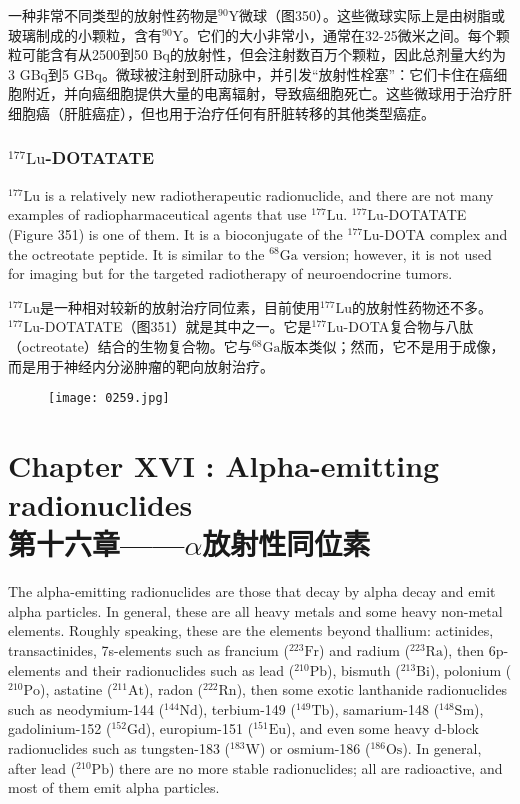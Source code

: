 \documentclass[dvipsnames, svgnames,a4paper,11pt]{article}
\begin{document}
一种非常不同类型的放射性药物是\(\mathrm{^{90}Y}\)微球（图350）。这些微球实际上是由树脂或玻璃制成的小颗粒，含有\(\mathrm{^{90}Y}\)。它们的大小非常小，通常在32-25微米之间。每个颗粒可能含有从2500到50 Bq的放射性，但会注射数百万个颗粒，因此总剂量大约为3 GBq到5 GBq。微球被注射到肝动脉中，并引发“放射性栓塞”：它们卡住在癌细胞附近，并向癌细胞提供大量的电离辐射，导致癌细胞死亡。这些微球用于治疗肝细胞癌（肝脏癌症），但也用于治疗任何有肝脏转移的其他类型癌症。

\subsubsection{\(\mathrm{^{177}Lu}\)-DOTATATE}  
\(\mathrm{^{177}Lu}\) is a relatively new radiotherapeutic radionuclide, and there are not many examples of radiopharmaceutical agents that use \(\mathrm{^{177}Lu}\). \(\mathrm{^{177}Lu}\)-DOTATATE (Figure 351) is one of them. It is a bioconjugate of the \(\mathrm{^{177}Lu}\)-DOTA complex and the octreotate peptide. It is similar to the \(\mathrm{^{68}Ga}\) version; however, it is not used for imaging but for the targeted radiotherapy of neuroendocrine tumors.

\(\mathrm{^{177}Lu}\)是一种相对较新的放射治疗同位素，目前使用\(\mathrm{^{177}Lu}\)的放射性药物还不多。\(\mathrm{^{177}Lu}\)-DOTATATE（图351）就是其中之一。它是\(\mathrm{^{177}Lu}\)-DOTA复合物与八肽（octreotate）结合的生物复合物。它与\(\mathrm{^{68}Ga}\)版本类似；然而，它不是用于成像，而是用于神经内分泌肿瘤的靶向放射治疗。

\begin{figure}[h]
    \centering
    \texttt{[image: 0259.jpg]}
     \label{fig351}
\end{figure}

\newpage




\section{Chapter XVI : Alpha-emitting radionuclides\\第十六章——$\alpha$放射性同位素}  
The alpha-emitting radionuclides are those that decay by alpha decay and emit alpha particles. In general, these are all heavy metals and some heavy non-metal elements. Roughly speaking, these are the elements beyond thallium: actinides, transactinides, 7s-elements such as francium (\(\mathrm{^{223}Fr}\)) and radium (\(\mathrm{^{223}Ra}\)), then 6p-elements and their radionuclides such as lead (\(\mathrm{^{210}Pb}\)), bismuth (\(\mathrm{^{213}Bi}\)), polonium (\(\mathrm{^{210}Po}\)), astatine (\(\mathrm{^{211}At}\)), radon (\(\mathrm{^{222}Rn}\)), then some exotic lanthanide radionuclides such as neodymium-144 (\(\mathrm{^{144}Nd}\)), terbium-149 (\(\mathrm{^{149}Tb}\)), samarium-148 (\(\mathrm{^{148}Sm}\)), gadolinium-152 (\(\mathrm{^{152}Gd}\)), europium-151 (\(\mathrm{^{151}Eu}\)), and even some heavy d-block radionuclides such as tungsten-183 (\(\mathrm{^{183}W}\)) or osmium-186 (\(\mathrm{^{186}Os}\)). In general, after lead (\(\mathrm{^{210}Pb}\)) there are no more stable radionuclides; all are radioactive, and most of them emit alpha particles.  
\end{document}
